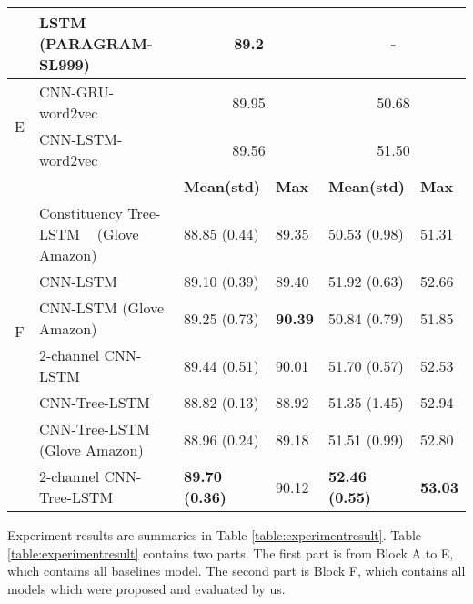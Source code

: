 \begin{table*}[]
\begin{tabular}{|c|l|ll|ll|}
		& LSTM (PARAGRAM-SL999)~\cite{wieting2015towards} & \multicolumn{2}{c|}{89.2} & \multicolumn{2}{c|}{-}
		\\
		\hline
		\multirow{2}{*}{E}  & CNN-GRU-word2vec~\cite{cnn-rnn}                    &\multicolumn{2}{c|}{89.95} & \multicolumn{2}{c|}{50.68} \\
		& CNN-LSTM-word2vec~\cite{cnn-rnn}   &       \multicolumn{2}{c|}{89.56} & \multicolumn{2}{c|}{51.50} \Bstrut    \\
		\Xhline{3\arrayrulewidth}
		\Xhline{3\arrayrulewidth}
		    &   & \textbf{Mean(std)} & \textbf{Max} & \textbf{Mean(std)} & \textbf{Max}  \\
		 \cline{3-6}
		\multirow{6}{*}{F} & Constituency Tree-LSTM ~\cite{treeLSTM} (Glove Amazon) & 88.85 (0.44) & 89.35 & 50.53 (0.98) & 51.31 \Tstrut \\
		 & CNN-LSTM                                 & 89.10 (0.39)  & 89.40 & 51.92 (0.63) & 52.66 \\
		  & CNN-LSTM (Glove Amazon) & 89.25 (0.73) & \textbf{90.39}  & 50.84 (0.79) & 51.85 \\
		& 2-channel CNN-LSTM                        & 89.44    (0.51) & 90.01 & 51.70 (0.57) & 52.53 \\
		 & CNN-Tree-LSTM                            & 88.82 (0.13) & 88.92 & 51.35 (1.45) & 52.94 \\
		& CNN-Tree-LSTM (Glove Amazon)             & 88.96 (0.24) & 89.18 & 51.51 (0.99) & 52.80 \\
		& 2-channel CNN-Tree-LSTM  & \textbf{89.70 (0.36)} & 90.12  & \textbf{52.46 (0.55)} & \textbf{53.03} \Bstrut  \\
		\hline
	\end{tabular}
\end{table*}
Experiment results are summaries in Table \ref{table:experimentresult}.
Table \ref{table:experimentresult} contains two parts.
The first part is from Block A to E, which contains all baselines model.
The second part is Block F, which contains all models which were proposed and evaluated by us.
